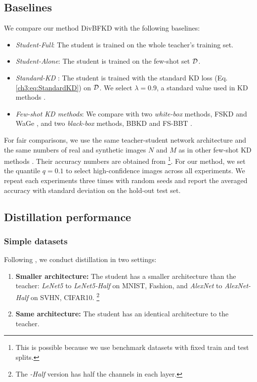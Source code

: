 \subsection{Baselines}
\begin{foldable}
We compare our method DivBFKD with the following baselines:
\begin{itemize}
    \item \textit{Student-Full}: The student is trained on the whole teacher's training set.
    \item \textit{Student-Alone}: The student is trained on the few-shot set ${\cal D}$.
    \item \textit{Standard-KD} \cite{hinton2015distilling}: The student is trained with the standard KD loss (Eq. \ref{ch3:eq:StandardKD}) on ${\cal D}$. We select $\lambda=0.9$, a standard value used in KD methods \cite{hinton2015distilling,tian2020contrastive,yuan2020revisiting,ma2021undistillable}.
    \item \textit{Few-shot KD methods}: We compare with two \textit{white-box} methods, FSKD \cite{kimura2018fewshot} and WaGe \cite{kong2020learning}, and two \textit{black-box} methods, BBKD \cite{wang2020neural} and FS-BBT \cite{nguyen2022black}.
\end{itemize}
\end{foldable}

\begin{foldable}
For fair comparisons, we use the same teacher-student network architecture and the same numbers of real and synthetic images $N$ and $M$ as in other few-shot KD methods \cite{kimura2018fewshot,wang2020neural,nguyen2022black}.
Their accuracy numbers are obtained from \cite{nguyen2022black}\footnote{This is possible because we use benchmark datasets with fixed train and test splits.}.
For our method, we set the quantile $q=0.1$ to select high-confidence images across all experiments.
We repeat each experiments three times with random seeds and report the averaged accuracy with standard deviation on the hold-out test set.
\end{foldable}


\subsection{Distillation performance}
\subsubsection{Simple datasets} \label{ch3:subsec:Few-class-datasets}
Following \cite{nguyen2022black}, we conduct distillation in two settings:
\begin{enumerate}
    \item \textbf{Smaller architecture:} The student has a smaller architecture than the teacher: \textit{LeNet5} to \textit{LeNet5-Half} on MNIST, Fashion, and \textit{AlexNet} to \textit{AlexNet-Half} on SVHN, CIFAR10. \footnote{The \textit{-Half} version has half the channels in each layer.}
    \item \textbf{Same architecture:} The student has an identical architecture to the teacher.
\end{enumerate}

